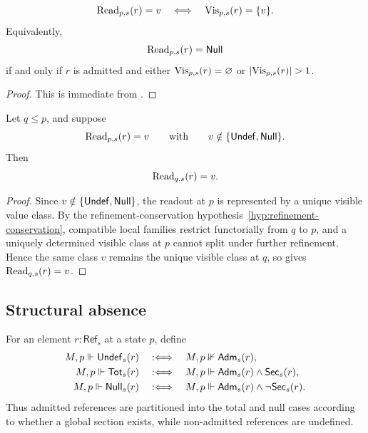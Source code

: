 \begin{corollary}\label{cor:nonnull-readout-criterion}
\[
\mathrm{Read}_{p,s}(r)=v
\quad\Longleftrightarrow\quad
\mathrm{Vis}_{p,s}(r)=\{v\}.
\]
Equivalently,
\[
\mathrm{Read}_{p,s}(r)=\mathsf{Null}
\]
if and only if $r$ is admitted and either $\mathrm{Vis}_{p,s}(r)=\varnothing$ or $|\Vis_{p,s}(r)|>1$.
\end{corollary}

\begin{proof}
This is immediate from .
\end{proof}

\begin{proposition}\label{prop:typed-readout-persistence}
Let $q\le p$, and suppose
\[
\mathrm{Read}_{p,s}(r)=v
\qquad\text{with}\qquad
v\notin\{\mathsf{Undef},\mathsf{Null}\}.
\]
Then
\[
\mathrm{Read}_{q,s}(r)=v.
\]
\end{proposition}

\begin{proof}
Since $v\notin\{\mathsf{Undef},\mathsf{Null}\}$, the readout at $p$ is represented by a unique visible value class. By the refinement-conservation hypothesis~\ref{hyp:refinement-conservation}, compatible local families restrict functorially from $q$ to $p$, and a uniquely determined visible class at $p$ cannot split under further refinement. Hence the same class $v$ remains the unique visible class at $q$, so  gives $\mathrm{Read}_{q,s}(r)=v$.
\end{proof}

\subsection{Structural absence}

\begin{definition}\label{def:undef-total-null}
For an element $r:\mathsf{Ref}_s$ at a state $p$, define
\begin{align*}
M,p\Vdash \mathsf{Undef}_s(r)
&\quad:\Longleftrightarrow\quad
M,p\nVdash \mathsf{Adm}_s(r),\\
M,p\Vdash \mathsf{Tot}_s(r)
&\quad:\Longleftrightarrow\quad
M,p\Vdash \mathsf{Adm}_s(r)\land \mathsf{Sec}_s(r),\\
M,p\Vdash \mathsf{Null}_s(r)
&\quad:\Longleftrightarrow\quad
M,p\Vdash \mathsf{Adm}_s(r)\land \neg\mathsf{Sec}_s(r).
\end{align*}
Thus admitted references are partitioned into the total and null cases according to whether a global section exists, while non-admitted references are undefined.
\end{definition}

